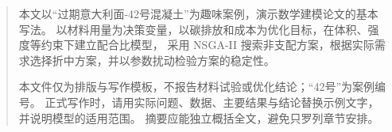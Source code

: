 \begin{abstract}
本文以“过期意大利面-42号混凝土”为趣味案例，演示数学建模论文的基本写法。
以材料用量为决策变量，以碳排放和成本为优化目标，在体积、强度等约束下建立配合比模型，
采用 NSGA-II 搜索非支配方案，根据实际需求选择折中方案，并以参数扰动检验方案的稳定性。

本文件仅为排版与写作模板，不报告材料试验或优化结论；“42号”为案例编号。
正式写作时，请用实际问题、数据、主要结果与结论替换示例文字，并说明模型的适用范围。
摘要应能独立概括全文，避免只罗列章节安排。

\end{abstract}
